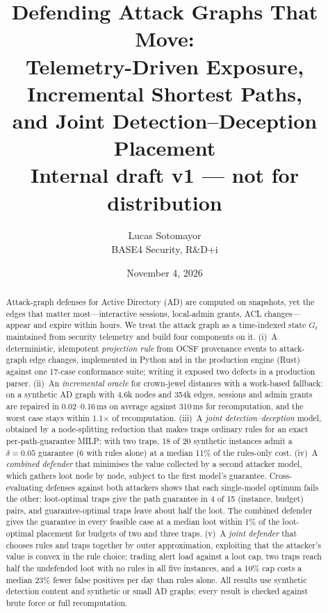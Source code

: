 \documentclass[10pt,twocolumn]{article}
\title{Defending Attack Graphs That Move:\\
Telemetry-Driven Exposure, Incremental Shortest Paths,\\
and Joint Detection--Deception Placement\\[4pt]
\large Internal draft v1 --- not for distribution}
\author{Lucas Sotomayor\\BASE4 Security, R\&D+i}
\date{November 4, 2026}
\newcommand{\Gt}{G_t}
\begin{document}
\maketitle

\begin{abstract}
Attack-graph defenses for Active Directory (AD) are computed on snapshots, yet the
edges that matter most---interactive sessions, local-admin grants, ACL changes---appear
and expire within hours. We treat the attack graph as a time-indexed state $\Gt$ maintained
from security telemetry and build four components on it. (i)~A deterministic, idempotent
\emph{projection rule} from OCSF provenance events to attack-graph edge changes, implemented
in Python and in the production engine (Rust) against one 17-case conformance suite; writing
it exposed two defects in a production parser. (ii)~An \emph{incremental oracle} for
crown-jewel distances with a work-based fallback: on a synthetic AD graph with 4.6k nodes and
354k edges, sessions and admin grants are repaired in 0.02--0.16\,ms on average against
310\,ms for recomputation, and the worst case stays within 1.1$\times$ of recomputation.
(iii)~A \emph{joint detection--deception} model, obtained by a node-splitting reduction that
makes traps ordinary rules for an exact per-path-guarantee MILP; with two traps, 18 of 20
synthetic instances admit a $\delta=0.05$ guarantee (6 with rules alone) at a median 11\% of the
rules-only cost. (iv)~A \emph{combined defender} that minimises the value collected by a
second attacker model, which gathers loot node by node, subject to the first model's
guarantee. Cross-evaluating defenses against both attackers shows that each single-model
optimum fails the other: loot-optimal traps give the path guarantee in 4 of 15
(instance, budget) pairs, and guarantee-optimal traps leave about half the loot. The combined
defender gives the guarantee in every feasible case at a median loot within 1\% of the
loot-optimal placement for budgets of two and three traps. (v)~A \emph{joint defender} that chooses
rules and traps together by outer approximation, exploiting that the attacker's value is convex in
the rule choice; trading alert load against a loot cap, two traps reach half the undefended loot with
no rules in all five instances, and a 10\% cap costs a median 23\% fewer false positives per day
than rules alone. All results use synthetic
detection content and synthetic or small AD graphs; every result is checked against brute
force or full recomputation.
\end{abstract}
\end{document}
